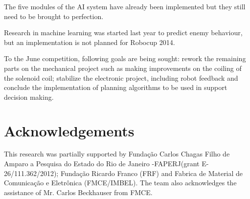 \documentclass{llncs}
\begin{document}
The five modules of the AI system have already been implemented but they still
need to be brought to perfection.

Research in machine learning was started last year to predict enemy behaviour,
but an implementation is not planned for Robocup 2014.

To the June competition, following goals are being sought: 
rework the remaining parts on the mechanical project such as making improvements on the coiling of the solenoid coil;
stabilize the electronic project, including robot feedback and
conclude the implementation of planning algorithms to be used in support decision making.

\section*{Acknowledgements}
This research was partially supported by Fundação Carlos Chagas Filho de Amparo a Pesquisa do Estado do Rio de Janeiro -FAPERJ(grant E-26/111.362/2012); Fundação Ricardo Franco (FRF) and Fabrica de Material de Comunicação e Eletrônica (FMCE/IMBEL). The team also acknowledges the assistance of Mr. Carlos Beckhauser from FMCE.
\end{document}
